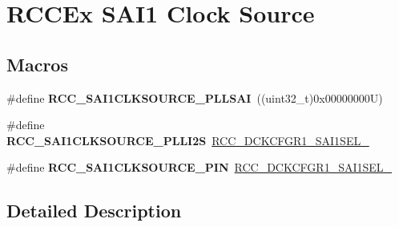 \hypertarget{group___r_c_c_ex___s_a_i1___clock___source}{}\section{R\+C\+C\+Ex S\+A\+I1 Clock Source}
\label{group___r_c_c_ex___s_a_i1___clock___source}
\subsection*{Macros}
\begin{DoxyCompactItemize}
\item 
\mbox{\label{group___r_c_c_ex___s_a_i1___clock___source_ga5dac6fab738e864e0ae930f7f853c223}} 
\#define {\bfseries R\+C\+C\+\_\+\+S\+A\+I1\+C\+L\+K\+S\+O\+U\+R\+C\+E\+\_\+\+P\+L\+L\+S\+AI}~((uint32\+\_\+t)0x00000000\+U)
\item 
\mbox{\label{group___r_c_c_ex___s_a_i1___clock___source_ga0b1b38441bc359af567e8202e1b8480d}} 
\#define {\bfseries R\+C\+C\+\_\+\+S\+A\+I1\+C\+L\+K\+S\+O\+U\+R\+C\+E\+\_\+\+P\+L\+L\+I2S}~\mbox{\hyperlink{group___peripheral___registers___bits___definition_ga48ece36510e9b2a797b0e62f35f3fe1b}{R\+C\+C\+\_\+\+D\+C\+K\+C\+F\+G\+R1\+\_\+\+S\+A\+I1\+S\+E\+L\+\_}}
\item 
\mbox{\label{group___r_c_c_ex___s_a_i1___clock___source_ga29ce7333b6f1e3430d2ba46b58513ba9}} 
\#define {\bfseries R\+C\+C\+\_\+\+S\+A\+I1\+C\+L\+K\+S\+O\+U\+R\+C\+E\+\_\+\+P\+IN}~\mbox{\hyperlink{group___peripheral___registers___bits___definition_ga7bddf80c972ba78461b0650b6ee34cc5}{R\+C\+C\+\_\+\+D\+C\+K\+C\+F\+G\+R1\+\_\+\+S\+A\+I1\+S\+E\+L\+\_}}
\end{DoxyCompactItemize}


\subsection{Detailed Description}
